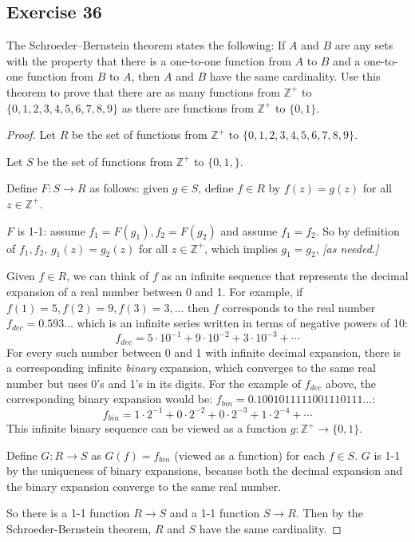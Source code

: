 \documentclass[14pt]{extarticle}
\newcommand{\Z}{\mathbb{Z}}
\begin{document}
\subsection{Exercise 36}
The Schroeder–Bernstein theorem states the following: If $A$ and $B$ are any sets with the property that there is a 
one-to-one function from $A$ to $B$ and a one-to-one function from $B$ to $A$, then $A$ and $B$ have the same 
cardinality. Use this theorem to prove that there are as many functions from \(\Z^+\) to \(\{0, 1, 2, 3, 4, 5, 6, 7, 
8, 9\}\) as there are functions from \(\Z^+\) to \(\{0, 1\}\).

\begin{proof}
Let $R$ be the set of functions from \(\Z^+\) to \(\{0, 1, 2, 3, 4, 5, 6, 7, 8, 9\}\).

Let $S$ be the set of functions from \(\Z^+\) to \(\{0, 1,\}\).

Define \(F: S \to R\) as follows: given $g \in S$, define $f \in R$ by \(f(z) = g(z)\) for all \(z \in \Z^+\). 

$F$ is 1-1: assume \(f_1 = F(g_1), f_2 = F(g_2)\) and assume \(f_1 = f_2\). So by definition of \(f_1, f_2\), 
\(g_1(z) = g_2(z)\) for all \(z \in \Z^+\), which implies \(g_1 = g_2\), {\it [as needed.]}

Given \(f \in R\), we can think of $f$ as an infinite sequence that represents the decimal expansion of a real 
number between 0 and 1. For example, if \(f(1) = 5, f(2) = 9, f(3) = 3, \ldots\) then $f$ corresponds to the real 
number \(f_{dec} = 0.593...\) which is an infinite series written in terms of negative powers of 10:
\[
f_{dec} = 5 \cdot 10^{-1} + 9 \cdot 10^{-2} + 3 \cdot 10^{-3} + \cdots
\]
For every such number between 0 and 1 with infinite decimal expansion, there is a corresponding infinite {\it binary}
expansion, which converges to the same real number but uses 0's and 1's in its digits. For the example of $f_{dec}$ 
above, the corresponding binary expansion would be: \(f_{bin} = 0.1001011111001110111...\):
\[
f_{bin} = 1 \cdot 2^{-1} + 0 \cdot 2^{-2} + 0 \cdot 2^{-3} + 1 \cdot 2^{-4} + \cdots
\]
This infinite binary sequence can be viewed as a function \(g:\Z^+ \to\{0,1\}\).

Define \(G: R \to S\) as \(G(f) = f_{bin}\) (viewed as a function) for each $f \in S$. $G$ is 1-1 by the uniqueness 
of binary expansions, because both the decimal expansion and the binary expansion converge to the same real number.

So there is a 1-1 function $R \to S$ and a 1-1 function $S \to R$. Then by the Schroeder-Bernstein theorem, $R$ and 
$S$ have the same cardinality.
\end{proof}
\end{document}
